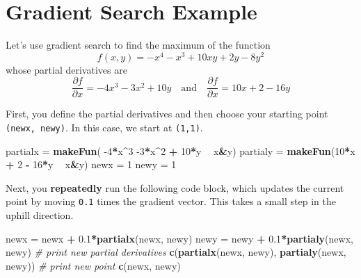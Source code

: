 \documentclass[
]{book}
\newenvironment{Shaded}{\begin{snugshade}}{\end{snugshade}}
\newcommand{\CommentTok}[1]{\textcolor[rgb]{0.56,0.35,0.01}{\textit{#1}}}
\newcommand{\DecValTok}[1]{\textcolor[rgb]{0.00,0.00,0.81}{#1}}
\newcommand{\FloatTok}[1]{\textcolor[rgb]{0.00,0.00,0.81}{#1}}
\newcommand{\KeywordTok}[1]{\textcolor[rgb]{0.13,0.29,0.53}{\textbf{#1}}}
\newcommand{\NormalTok}[1]{#1}
\newcommand{\OperatorTok}[1]{\textcolor[rgb]{0.81,0.36,0.00}{\textbf{#1}}}
\newcommand{\StringTok}[1]{\textcolor[rgb]{0.31,0.60,0.02}{#1}}
\begin{document}
\hypertarget{gradient-search-example}{%
\section{Gradient Search Example}\label{gradient-search-example}}

Let's use gradient search to find the maximum of the function
\[
f(x,y) = - x^4 -  x^3 + 10 x y + 2y - 8 y^2 
\]
whose partial derivatives are
\[
\frac{\partial f}{\partial x} = -4 x^3 -3 x^2  + 10 y
\quad \mbox{and} \quad
\frac{\partial f}{\partial x} = 10 x + 2 - 16 y
\]

First, you define the partial derivatives and then choose your starting point \texttt{(newx,\ newy)}. In this case, we start at \texttt{(1,1)}.

\medskip

\begin{Shaded}
\begin{Highlighting}[]
\NormalTok{partialx =}\StringTok{ }\KeywordTok{makeFun}\NormalTok{( }\DecValTok{-4}\OperatorTok{*}\NormalTok{x}\OperatorTok{^}\DecValTok{3} \DecValTok{-3}\OperatorTok{*}\NormalTok{x}\OperatorTok{^}\DecValTok{2} \OperatorTok{+}\StringTok{ }\DecValTok{10}\OperatorTok{*}\NormalTok{y }\OperatorTok{~}\StringTok{ }\NormalTok{x}\OperatorTok{&}\NormalTok{y)}
\NormalTok{partialy =}\StringTok{ }\KeywordTok{makeFun}\NormalTok{(}\DecValTok{10}\OperatorTok{*}\NormalTok{x }\OperatorTok{+}\StringTok{ }\DecValTok{2} \OperatorTok{-}\StringTok{ }\DecValTok{16}\OperatorTok{*}\NormalTok{y }\OperatorTok{~}\StringTok{ }\NormalTok{x}\OperatorTok{&}\NormalTok{y)}
\NormalTok{newx =}\StringTok{ }\DecValTok{1}
\NormalTok{newy =}\StringTok{ }\DecValTok{1}
\end{Highlighting}
\end{Shaded}

\medskip

Next, you \textbf{repeatedly} run the following code block, which updates the current point by moving \texttt{0.1} times the gradient vector. This takes a small step in the uphill direction.

\begin{Shaded}
\begin{Highlighting}[]
\NormalTok{newx =}\StringTok{ }\NormalTok{newx }\OperatorTok{+}\StringTok{ }\FloatTok{0.1}\OperatorTok{*}\KeywordTok{partialx}\NormalTok{(newx, newy)}
\NormalTok{newy =}\StringTok{ }\NormalTok{newy }\OperatorTok{+}\StringTok{ }\FloatTok{0.1}\OperatorTok{*}\KeywordTok{partialy}\NormalTok{(newx, newy)}
\CommentTok{# print new partial derivatives}
\KeywordTok{c}\NormalTok{(}\KeywordTok{partialx}\NormalTok{(newx, newy), }\KeywordTok{partialy}\NormalTok{(newx, newy))}
\CommentTok{# print new point}
\KeywordTok{c}\NormalTok{(newx, newy)}
\end{Highlighting}
\end{Shaded}
\end{document}
